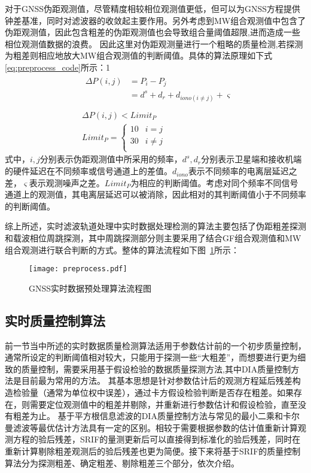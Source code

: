对于GNSS伪距观测值，尽管精度相较相位观测值更低，但可以为GNSS方程提供钟差基准，同时对滤波器的收敛起主要作用。另外考虑到MW组合观测值中包含了伪距观测值，因此包含粗差的伪距观测值也会导致组合量阈值超限,进而造成一些相位观测值数据的浪费。
因此这里对伪距观测量进行一个粗略的质量检测,若探测为粗差则相应地放大MW组合观测值的判断阈值。具体的算法原理如下式\eqref{eq:preprocess_code}所示：1
\begin{equation}
	\begin{aligned}
		& \begin{aligned}
			 \Delta P(i,j)&=P_{i}-P_{j} \\
		& = d^{s}+d_{r}+d_{iono(i\not=j)}+\varsigma \\
		\end{aligned} \\
		& \Delta P(i,j) <Limit_{P}\\
		& Limit_{P} = \begin{cases}
			10 & i=j \\ 
			30 & i\not=j \\
		\end{cases}
	\end{aligned}
	\label{eq:preprocess_code}
\end{equation}
式中，\(i,j\)分别表示伪距观测值中所采用的频率，\(d^{s},d_{r}\)分别表示卫星端和接收机端的硬件延迟在不同频率或信号通道上的差值。\(d_{iono}\)表示不同频率的电离层延迟之差，\(\varsigma\)表示观测噪声之差。\(Limit_{P}\)为相应的判断阈值。考虑对同个频率不同信号通道上的观测值，其电离层延迟可以被消除，因此相对的其判断阈值小于不同频率的判断阈值。

综上所述，实时滤波轨道处理中实时数据处理检测的算法主要包括了伪距粗差探测和载波相位周跳探测，其中周跳探测部分则主要采用了结合GF组合观测值和MW组合观测进行联合判断的方式。整体的算法流程如下图~\ref{fig:tb_flowchart}所示：
\begin{figure}
  \centering
  \texttt{[image: preprocess.pdf]}
  \caption{GNSS实时数据预处理算法流程图}
  \label{fig:tb_flowchart}
\end{figure}

\subsection{实时质量控制算法}
前一节当中所述的实时数据质量检测算法适用于参数估计前的一个初步质量控制，通常所设定的判断阈值相对较大，只能用于探测一些“大粗差”，而想要进行更为细致的质量控制，需要采用基于假设检验的数据质量探测方法,其中DIA质量控制方法是目前最为常用的方法。
其基本思想是针对参数估计后的观测方程延后残差构造检验量（通常为单位权中误差），通过卡方假设检验判断是否存在粗差。如果存在，则需要定位观测值中的粗差并剔除，并重新进行参数估计和假设检验，直至没有粗差为止。
基于平方根信息滤波的DIA质量控制方法与常见的最小二乘和卡尔曼滤波等最优估计方法具有一定的区别。相较于需要根据参数的估计值重新计算观测方程的验后残差，SRIF的量测更新后可以直接得到标准化的验后残差，同时在重新计算剔除粗差观测后的验后残差也更为简便。接下来将基于SRIF的质量控制算法分为探测粗差、确定粗差、剔除粗差三个部分，依次介绍。


